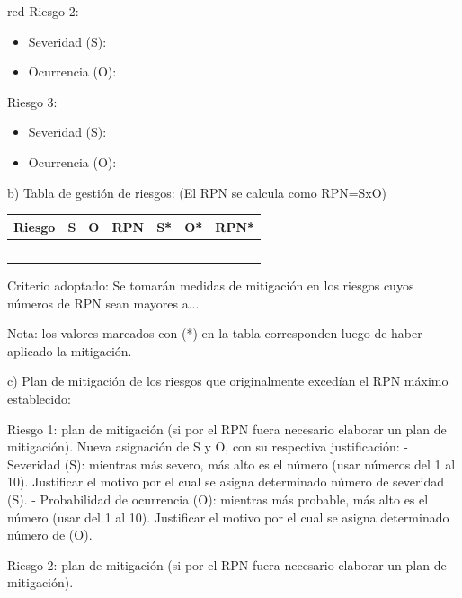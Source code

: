 \documentclass[
11pt, %
]{charter}
\begin{document}
{\begin{consigna}{red}
Riesgo 2:
\begin{itemize}
	\item Severidad (S): 
	\item Ocurrencia (O):
\end{itemize}

Riesgo 3:
\begin{itemize}
	\item Severidad (S): 
	\item Ocurrencia (O):
\end{itemize}


b) Tabla de gestión de riesgos:      (El RPN se calcula como RPN=SxO)

\begin{table}[htpb]
\centering
\begin{tabularx}{\linewidth}{@{}|X|c|c|c|c|c|c|@{}}
\hline
\rowcolor[HTML]{C0C0C0} 
Riesgo & S & O & RPN & S* & O* & RPN* \\ \hline
       &   &   &     &    &    &      \\ \hline
       &   &   &     &    &    &      \\ \hline
       &   &   &     &    &    &      \\ \hline
       &   &   &     &    &    &      \\ \hline
       &   &   &     &    &    &      \\ \hline
\end{tabularx}%
\end{table}

Criterio adoptado: 
Se tomarán medidas de mitigación en los riesgos cuyos números de RPN sean mayores a...

Nota: los valores marcados con (*) en la tabla corresponden luego de haber aplicado la mitigación.

c) Plan de mitigación de los riesgos que originalmente excedían el RPN máximo establecido:
 
Riesgo 1: plan de mitigación (si por el RPN fuera necesario elaborar un plan de mitigación).
  Nueva asignación de S y O, con su respectiva justificación:
  - Severidad (S): mientras más severo, más alto es el número (usar números del 1 al 10).
          Justificar el motivo por el cual se asigna determinado número de severidad (S).
  - Probabilidad de ocurrencia (O): mientras más probable, más alto es el número (usar del 1 al 10).
          Justificar el motivo por el cual se asigna determinado número de (O).

Riesgo 2: plan de mitigación (si por el RPN fuera necesario elaborar un plan de mitigación).
 

\end{consigna}}
\end{document}
